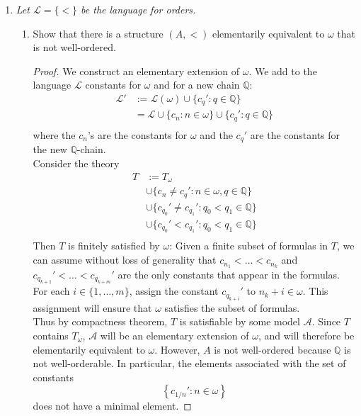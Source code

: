 \documentclass{article}
\begin{document}
\begin{enumerate}[label={\bf Q\arabic*:}]
  \item \it Let $\mathcal{L}=\{<\}$ be the language for orders.
    \begin{enumerate}[label={\bf(\arabic*)}]
      \item Show that there is a structure $(A,<)$ elementarily equivalent
        to $\omega$ that is not well-ordered.

        \begin{proof}
          We construct an elementary extension of $\omega$. We add to the
          language $\mathcal{L}$ constants for $\omega$ and for a new
          chain $\mathbb{Q}$:
          \begin{align*}
            \mathcal{L}' &:=\mathcal{L}(\omega)\cup\{c_q':q\in\mathbb{Q}\}
              \\
            &=\mathcal{L}\cup\{c_n:n\in\omega\}\cup\{c_q':q\in\mathbb{Q}\}
              \\
          \end{align*}
          where the $c_n$'s are the constants for $\omega$ and the $c_q'$
          are the constants for the new $\mathbb{Q}$-chain. \\

          Consider the theory
          \begin{align*}
            T &:= T_\omega \\
            &\cup \{c_n\neq c_q':n\in\omega, q\in\mathbb{Q}\} \\
            &\cup \{c_{q_0}'\neq c_{q_1}':q_0<q_1\in\mathbb{Q}\} \\
            &\cup \{c_{q_0}'<c_{q_1}':q_0<q_1\in\mathbb{Q}\} \\
          \end{align*}
          Then $T$ is finitely satisfied by $\omega$: Given a finite subset
          of formulas in $T$, we can assume without loss of generality that
          $c_{n_1}<\ldots<c_{n_k}$ and $c_{q_{k+1}}'<\ldots<c_{q_{k+m}}'$
          are the only constants that appear in the formulas. For each
          $i\in\{1,\ldots,m\}$, assign the constant $c_{q_{k+i}}'$ to
          $n_{k}+i\in\omega$. This assignment will ensure that $\omega$
          satisfies the subset of formulas. \\

          Thus by compactness theorem, $T$ is satisfiable by some model
          $\mathcal{A}$. Since $T$ contains $T_\omega$, $\mathcal{A}$ will
          be an elementary extension of $\omega$, and will therefore be
          elementarily equivalent to $\omega$. However, $A$ is not
          well-ordered because $\mathbb{Q}$ is not well-orderable. In
          particular, the elements associated with the set of constants
          \[\left\{c_{1/n}':n\in\omega\right\}\] does not have a minimal
          element.


\end{proof}
\end{enumerate}
\end{enumerate}
\end{document}
